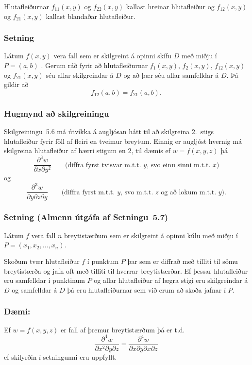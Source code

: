 Hlutafleiðurnar $f_{11}(x,y)$ og $f_{22}(x,y)$ kallast hreinar
hlutafleiður og $f_{12}(x,y)$ og $f_{21}(x,y)$ kallast blandaðar
hlutafleiður.  
 

 \subsubsection{Setning }
  Látum $f(x,y)$ vera fall sem er skilgreint á opinni
skífu $D$ með miðju í $P=(a,b)$ .  Gerum ráð fyrir að
hlutafleiðurnar $f_1(x,y)$, $f_2(x,y)$, $f_{12}(x,y)$ og $f_{21}(x,y)$
séu allar skilgreindar á $D$ og að þær séu allar samfelldar á $D$.  Þá
gildir að 
$$f_{12}(a,b)=f_{21}(a,b).$$
 


 \subsubsection{Hugmynd að skilgreiningu }
  Skilgreiningu~5.6 má útvíkka á augljósan hátt
til að skilgreina 2.~stigs hlutafleiður fyrir föll af fleiri en
tveimur breytum.   Einnig er augljóst hvernig má skilgreina
hlutafleiður af hærri stigum en 2, til dæmis ef $w=f(x,y,z)$ þá 
$$\frac{\partial^3 w}{\partial x\partial y^2} \quad\quad\mbox{(diffra
    fyrst tvisvar m.t.t. }y\mbox{, svo einu sinni m.t.t. } x\mbox{)}$$
og 
$$\frac{\partial^3 w}{\partial y\partial z\partial y} \quad\quad\mbox{(diffra
    fyrst m.t.t. } y\mbox{, svo m.t.t. } z
\mbox{ og að lokum m.t.t. }y\mbox{)}.$$

 
 \subsubsection{Setning  (Almenn útgáfa af Setningu~5.7)}
     Látum $f$ vera
fall $n$ breytistærðum sem er skilgreint á opinni kúlu með miðju í 
$P=(x_1, x_2,\ldots, x_n)$.  

\medskip
Skoðum tvær hlutafleiður $f$ í punktum $P$
þar sem er diffrað með tilliti til sömu breytistærða og jafn oft með
tilliti til hverrar breytistærðar.  Ef þessar hlutafleiður eru
samfelldar í punktinum $P$ og allar hlutafleiður af lægra stigi eru
skilgreindar á $D$ og samfelldar á $D$ þá eru hlutafleiðurnar sem við
erum að skoða jafnar í $P$.
 

 \subsubsection {Dæmi:} 
 Ef $w = f(x,y,z)$ er fall af þremur breytistærðum þá er t.d.~
 \begin {equation*}
  \frac{\partial^4 w}{\partial x^2\partial y \partial z} = \frac{\partial^4 w}{\partial x \partial y \partial x \partial z}
 \end {equation*}
ef skilyrðin í setningunni eru uppfyllt.
  
